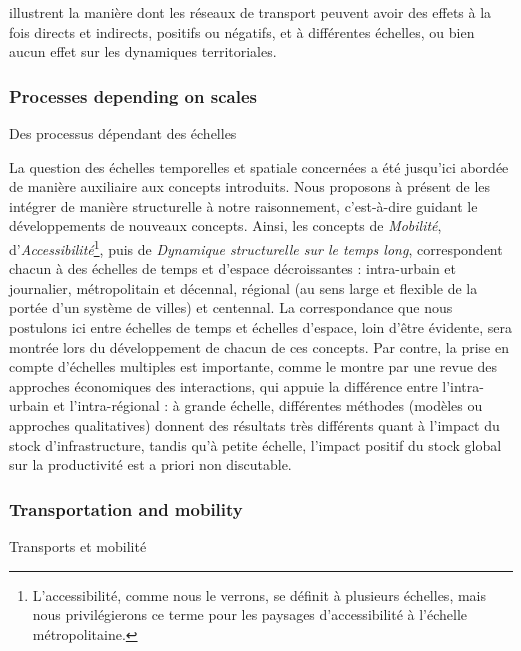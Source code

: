 {illustrent la manière dont les réseaux de transport peuvent avoir des effets à la fois directs et indirects, positifs ou négatifs, et à différentes échelles, ou bien aucun effet sur les dynamiques territoriales.
}





\subsubsection{Processes depending on scales}{Des processus dépendant des échelles}

La question des échelles temporelles et spatiale concernées a été jusqu'ici abordée de manière auxiliaire aux concepts introduits. Nous proposons à présent de les intégrer de manière structurelle à notre raisonnement, c'est-à-dire guidant le développements de nouveaux concepts. Ainsi, les concepts de \emph{Mobilité}, d'\emph{Accessibilité}\footnote{L'accessibilité, comme nous le verrons, se définit à plusieurs échelles, mais nous privilégierons ce terme pour les paysages d'accessibilité à l'échelle métropolitaine.}, puis de \emph{Dynamique structurelle sur le temps long}, correspondent chacun à des échelles de temps et d'espace décroissantes : intra-urbain et journalier, métropolitain et décennal, régional (au sens large et flexible de la portée d'un système de villes) et centennal. La correspondance que nous postulons ici entre échelles de temps et échelles d'espace, loin d'être évidente, sera montrée lors du développement de chacun de ces concepts. Par contre, la prise en compte d'échelles multiples est importante, comme le montre \cite{RIETVELD1994329} par une revue des approches économiques des interactions, qui appuie la différence entre l'intra-urbain et l'intra-régional : à grande échelle, différentes méthodes (modèles ou approches qualitatives) donnent des résultats très différents quant à l'impact du stock d'infrastructure, tandis qu'à petite échelle, l'impact positif du stock global sur la productivité est a priori non discutable.




\subsubsection{Transportation and mobility}{Transports et mobilité}


